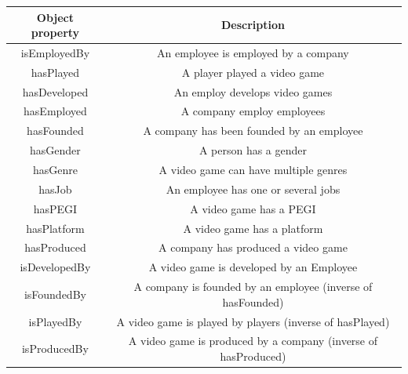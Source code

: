 \documentclass{article}
\begin{document}
\begin{table}[h!]
\centering
 \begin{tabular}{| c c |} 
 \hline
Object property & Description \\ [0.5ex] 
 \hline\hline
 isEmployedBy & An employee is employed by a company  \\
 hasPlayed &  A player played a video game \\
 hasDeveloped & An employ develops video games \\
 hasEmployed & A company employ employees\\
 hasFounded & A company has been founded by an employee \\
 hasGender & A person has a gender   \\
 hasGenre & A video game can have multiple genres \\
 hasJob & An employee has one or several jobs   \\
 hasPEGI & A video game has a PEGI  \\
 hasPlatform & A video game has a platform \\
 hasProduced & A company has produced a video game\\
 isDevelopedBy & A video game is developed by an Employee \\
 isFoundedBy & A company is founded by an employee (inverse of hasFounded)  \\
 isPlayedBy & A video game is played by players (inverse of hasPlayed)  \\
 isProducedBy & A video game is produced by a company (inverse of hasProduced)  \\[1ex] 
 \hline
 \end{tabular}
\end{table}
\end{document}
